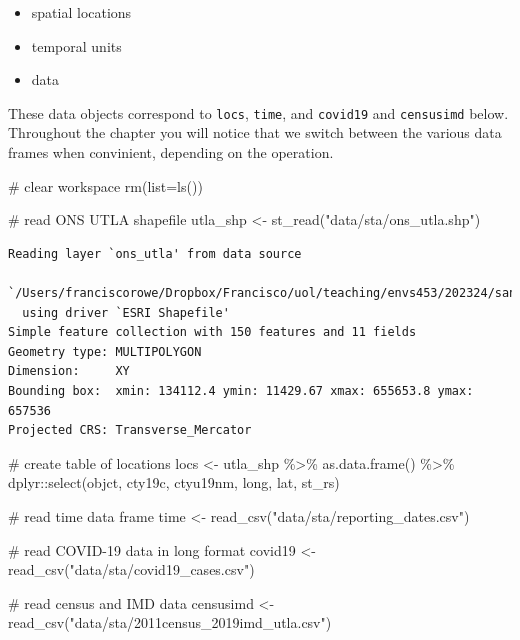 \documentclass[
  letterpaper,
  DIV=11,
  numbers=noendperiod,
  oneside]{scrreprt}
\newenvironment{Shaded}{\begin{snugshade}}{\end{snugshade}}
\newcommand{\AttributeTok}[1]{\textcolor[rgb]{0.40,0.45,0.13}{#1}}
\newcommand{\CommentTok}[1]{\textcolor[rgb]{0.37,0.37,0.37}{#1}}
\newcommand{\FunctionTok}[1]{\textcolor[rgb]{0.28,0.35,0.67}{#1}}
\newcommand{\NormalTok}[1]{\textcolor[rgb]{0.00,0.23,0.31}{#1}}
\newcommand{\OtherTok}[1]{\textcolor[rgb]{0.00,0.23,0.31}{#1}}
\newcommand{\SpecialCharTok}[1]{\textcolor[rgb]{0.37,0.37,0.37}{#1}}
\newcommand{\StringTok}[1]{\textcolor[rgb]{0.13,0.47,0.30}{#1}}
\begin{document}
\begin{itemize}
\item
  spatial locations
\item
  temporal units
\item
  data
\end{itemize}

These data objects correspond to \texttt{locs}, \texttt{time}, and
\texttt{covid19} and \texttt{censusimd} below. Throughout the chapter
you will notice that we switch between the various data frames when
convinient, depending on the operation.

\begin{Shaded}
\begin{Highlighting}[]
\CommentTok{\# clear workspace}
\FunctionTok{rm}\NormalTok{(}\AttributeTok{list=}\FunctionTok{ls}\NormalTok{())}

\CommentTok{\# read ONS UTLA shapefile}
\NormalTok{utla\_shp }\OtherTok{\textless{}{-}} \FunctionTok{st\_read}\NormalTok{(}\StringTok{"data/sta/ons\_utla.shp"}\NormalTok{) }
\end{Highlighting}
\end{Shaded}

\begin{verbatim}
Reading layer `ons_utla' from data source 
  `/Users/franciscorowe/Dropbox/Francisco/uol/teaching/envs453/202324/san/data/sta/ons_utla.shp' 
  using driver `ESRI Shapefile'
Simple feature collection with 150 features and 11 fields
Geometry type: MULTIPOLYGON
Dimension:     XY
Bounding box:  xmin: 134112.4 ymin: 11429.67 xmax: 655653.8 ymax: 657536
Projected CRS: Transverse_Mercator
\end{verbatim}

\begin{Shaded}
\begin{Highlighting}[]
\CommentTok{\# create table of locations}
\NormalTok{locs }\OtherTok{\textless{}{-}}\NormalTok{ utla\_shp }\SpecialCharTok{\%\textgreater{}\%} \FunctionTok{as.data.frame}\NormalTok{() }\SpecialCharTok{\%\textgreater{}\%}
\NormalTok{  dplyr}\SpecialCharTok{::}\FunctionTok{select}\NormalTok{(objct, cty19c, ctyu19nm, long, lat, st\_rs) }

\CommentTok{\# read time data frame}
\NormalTok{time }\OtherTok{\textless{}{-}} \FunctionTok{read\_csv}\NormalTok{(}\StringTok{"data/sta/reporting\_dates.csv"}\NormalTok{)}

\CommentTok{\# read COVID{-}19 data in long format}
\NormalTok{covid19 }\OtherTok{\textless{}{-}} \FunctionTok{read\_csv}\NormalTok{(}\StringTok{"data/sta/covid19\_cases.csv"}\NormalTok{)}

\CommentTok{\# read census and IMD data}
\NormalTok{censusimd }\OtherTok{\textless{}{-}} \FunctionTok{read\_csv}\NormalTok{(}\StringTok{"data/sta/2011census\_2019imd\_utla.csv"}\NormalTok{)}
\end{Highlighting}
\end{Shaded}
\end{document}
